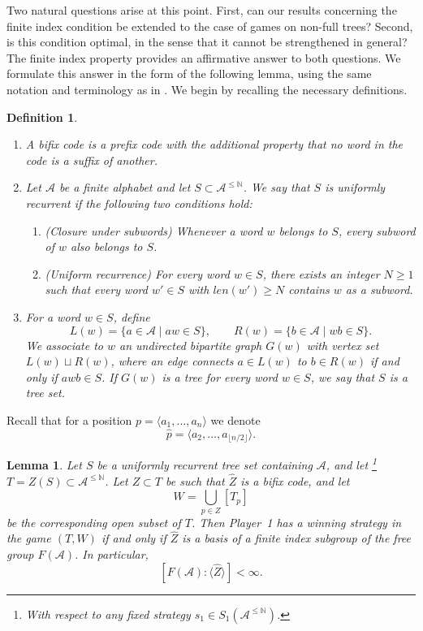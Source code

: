 \documentclass[a4,12pt]{article}%
\newtheorem{definition}[theorem]{Definition}
\newtheorem{lemma}[theorem]{Lemma}
\newcommand{\N}{\mathbb{N}}
\begin{document}
Two natural questions arise at this point. First, can our results concerning the finite index condition be extended to the case of games on non-full trees? Second, is this condition optimal, in the sense that it cannot be strengthened in general? The finite index property \cite{FiniteIndexProperty} provides an affirmative answer to both questions. We formulate this answer in the form of the following lemma, using the same notation and terminology as in \cite{FiniteIndexProperty}. We begin by recalling the necessary definitions.

\begin{definition}
\begin{enumerate}
    \item A \emph{bifix code} is a prefix code with the additional property that no word in the code is a suffix of another.
    
    \item Let $\mathcal{A}$ be a finite alphabet and let $S \subset \mathcal{A}^{\le \mathbb{N}}$. We say that $S$ is \emph{uniformly recurrent} if the following two conditions hold:
    \begin{enumerate}
        \item (\emph{Closure under subwords})  
        Whenever a word $w$ belongs to $S$, every subword of $w$ also belongs to $S$.
        
        \item (\emph{Uniform recurrence})  
        For every word $w \in S$, there exists an integer $N \geq 1$ such that every word $w' \in S$ with
        $len( w')  \geq N$ contains $w$ as a subword.
    \end{enumerate}
    
    \item For a word $w \in S$, define
    \[
    L(w) = \{ a \in \mathcal{A} \mid aw \in S \}, \qquad
    R(w) = \{ b \in \mathcal{A} \mid wb \in S \}.
    \]
    We associate to $w$ an undirected bipartite graph $G(w)$ with vertex set $L(w) \sqcup R(w)$, where an edge connects $a \in L(w)$ to $b \in R(w)$ if and only if $awb \in S$. If $G(w)$ is a tree for every word $w \in S$, we say that $S$ is a \emph{tree set}.
\end{enumerate}
\end{definition}

Recall that for a position $p=\langle a_1,\dots,a_n\rangle$ we denote
\[
\hat{p} = \langle a_2,\dots,a_{\lfloor n/2 \rfloor} \rangle .
\]

\begin{lemma}
Let $S$ be a uniformly recurrent tree set containing $\mathcal{A}$, and let \footnote{With respect to any fixed strategy $s_1\in S_1(\mathcal{A}^{\le \N})$.} $T = Z(S) \subset \mathcal{A}^{\le \mathbb{N}}$. Let $Z \subset T$ be such that $\hat{Z}$ is a bifix code, and let
\[
W = \bigcup_{p \in Z} [T_p]
\]
be the corresponding open subset of $T$. Then Player~1 has a winning strategy in the game $(T,W)$ if and only if $\hat{Z}$ is a basis of a finite index subgroup of the free group $F(\mathcal{A})$. In particular,
\[
[F(\mathcal{A}) : \langle \hat{Z} \rangle] < \infty .
\]
\end{lemma}
\end{document}
